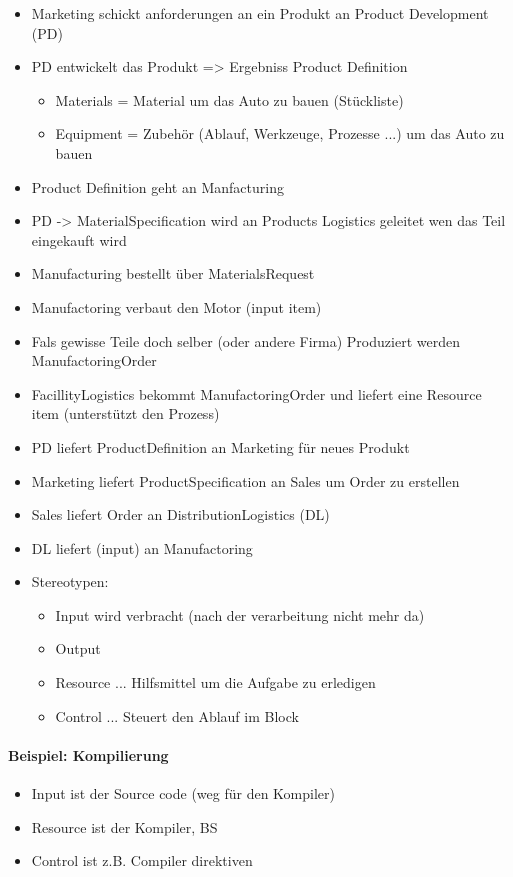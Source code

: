 \begin{itemize}
\item Marketing schickt anforderungen an ein Produkt an Product Development (PD)
\item
{
PD entwickelt das Produkt => Ergebniss Product Definition
\begin{itemize}
\item Materials = Material um das Auto zu bauen (Stückliste)
\item Equipment = Zubehör (Ablauf, Werkzeuge, Prozesse ...) um das Auto zu bauen
\end{itemize}
}
\item Product Definition geht an Manfacturing
\item PD -> MaterialSpecification wird an Products Logistics geleitet wen das Teil eingekauft wird
\item Manufacturing bestellt über MaterialsRequest
\item Manufactoring verbaut den Motor (input item)
\item Fals gewisse Teile doch selber (oder andere Firma) Produziert werden ManufactoringOrder
\item FacillityLogistics bekommt ManufactoringOrder und liefert eine Resource item (unterstützt den Prozess)
\item PD liefert ProductDefinition an Marketing für neues Produkt
\item Marketing liefert ProductSpecification an Sales um Order zu erstellen
\item Sales liefert Order an DistributionLogistics (DL)
\item DL liefert (input) an Manufactoring
\item
{
Stereotypen:
\begin{itemize}
\item Input wird verbracht (nach der verarbeitung nicht mehr da)
\item Output 
\item Resource ... Hilfsmittel um die Aufgabe zu erledigen
\item Control ... Steuert den Ablauf im Block
\end{itemize}
}
\end{itemize}

\paragraph{Beispiel: Kompilierung}

\begin{itemize}
\item Input ist der Source code (weg für den Kompiler)
\item Resource ist der Kompiler, BS
\item Control ist z.B. Compiler direktiven
\end{itemize}

